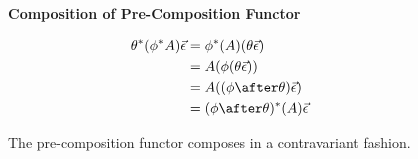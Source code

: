 \documentclass{Report}
\begin{document}
\begin{figure}
    \begin{framed}
        \centering
        \textbf{Composition of Pre-Composition Functor}

        \begin{align*}
            \theta\star(\phi\star A) \ev & = \phi\star(A)(\theta \ev)\\
            & = A(\phi(\theta\ev))\\
            & = A((\phi\after\theta) \ev)\\
            & = (\phi\after\theta)\star(A) \ev
        \end{align*}
    \end{framed}

    \caption{The pre-composition functor composes in a contravariant fashion.}
    \label{PrecompositionFunctorComposition}
\end{figure}
\end{document}
